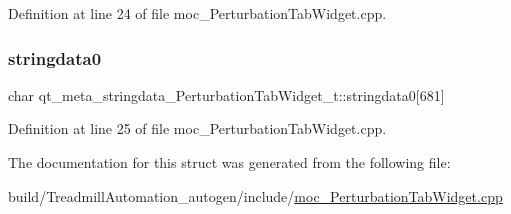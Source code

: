 Definition at line 24 of file moc\+\_\+\+Perturbation\+Tab\+Widget.\+cpp.

\mbox{\label{structqt__meta__stringdata___perturbation_tab_widget__t_a6e2e7d99d25072f057d379f75a2c46c3}} 
\subsubsection{\texorpdfstring{stringdata0}{stringdata0}}
{\footnotesize\ttfamily char qt\+\_\+meta\+\_\+stringdata\+\_\+\+Perturbation\+Tab\+Widget\+\_\+t\+::stringdata0\mbox{[}681\mbox{]}}



Definition at line 25 of file moc\+\_\+\+Perturbation\+Tab\+Widget.\+cpp.



The documentation for this struct was generated from the following file\+:\begin{DoxyCompactItemize}
\item 
build/\+Treadmill\+Automation\+\_\+autogen/include/\hyperlink{moc___perturbation_tab_widget_8cpp}{moc\+\_\+\+Perturbation\+Tab\+Widget.\+cpp}\end{DoxyCompactItemize}
